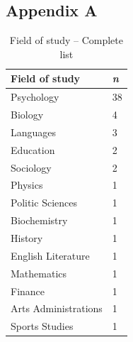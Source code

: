 \documentclass[serif, authordate, twocolumn, empirical]{jote-article}
\begin{document}
\subsection*{\hypertarget{A}{Appendix A}} 
\begin{table}[h] \sffamily
\begin{tabular}{@{}p{}p{}@{}}
\toprule
\textbf{Field of study} & \textit{\textbf{n}} \\ \midrule
Psychology           & 38 \\
Biology              & 4  \\
Languages            & 3  \\
Education            & 2  \\
Sociology            & 2  \\
Physics              & 1  \\
Politic Sciences     & 1  \\ 
Biochemistry         & 1  \\
History              & 1  \\
English Literature   & 1  \\
Mathematics          & 1  \\
Finance              & 1  \\
Arts Administrations & 1  \\
Sports Studies       & 1  \\
\bottomrule
\end{tabular}
\caption{Field of study -- Complete list}
\end{table}


{}
\end{document}
